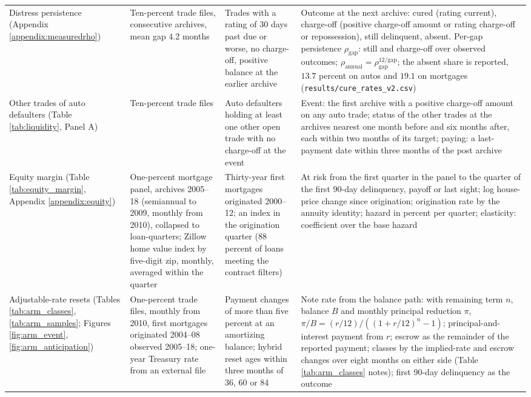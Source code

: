 \begin{longtable}{@{}>{\raggedright\arraybackslash}p{2.5cm}>{\raggedright\arraybackslash}p{3.5cm}>{\raggedright\arraybackslash}p{3.6cm}>{\raggedright\arraybackslash}p{5.2cm}@{}}
Distress persistence (Appendix \ref{appendix:measuredrho}) & Ten-percent trade files, consecutive archives, mean gap $4.2$ months & Trades with a rating of 30 days past due or worse, no charge-off, positive balance at the earlier archive & Outcome at the next archive: cured (rating current), charge-off (positive charge-off amount or rating charge-off or repossession), still delinquent, absent. Per-gap persistence $\rho_{\text{gap}}$: still and charge-off over observed outcomes; $\rho_{\text{annual}} = \rho_{\text{gap}}^{12/\text{gap}}$; the absent share is reported, $13.7$ percent on autos and $19.1$ on mortgages (\texttt{results/cure\_rates\_v2.csv}) \\
Other trades of auto defaulters (Table \ref{tab:liquidity}, Panel A) & Ten-percent trade files & Auto defaulters holding at least one other open trade with no charge-off at the event & Event: the first archive with a positive charge-off amount on any auto trade; status of the other trades at the archives nearest one month before and six months after, each within two months of its target; paying: a last-payment date within three months of the post archive \\
Equity margin (Table \ref{tab:equity_margin}, Appendix \ref{appendix:equity}) & One-percent mortgage panel, archives 2005--18 (semiannual to 2009, monthly from 2010), collapsed to loan-quarters; Zillow home value index by five-digit zip, monthly, averaged within the quarter & Thirty-year first mortgages originated 2000--12; an index in the origination quarter (88 percent of loans meeting the contract filters) & At risk from the first quarter in the panel to the quarter of the first 90-day delinquency, payoff or last sight; log house-price change since origination; origination rate by the annuity identity; hazard in percent per quarter; elasticity: coefficient over the base hazard \\
Adjustable-rate resets (Tables \ref{tab:arm_classes}, \ref{tab:arm_samples}; Figures \ref{fig:arm_event}, \ref{fig:arm_anticipation}) & One-percent trade files, monthly from 2010, first mortgages originated 2004--08 observed 2005--18; one-year Treasury rate from an external file & Payment changes of more than five percent at an amortizing balance; hybrid reset ages within three months of 36, 60 or 84 & Note rate from the balance path: with remaining term $n$, balance $B$ and monthly principal reduction $\pi$, $\pi/B = (r/12)/((1+r/12)^n - 1)$; principal-and-interest payment from $r$; escrow as the remainder of the reported payment; classes by the implied-rate and escrow changes over eight months on either side (Table \ref{tab:arm_classes} notes); first 90-day delinquency as the outcome \\

\end{longtable}
